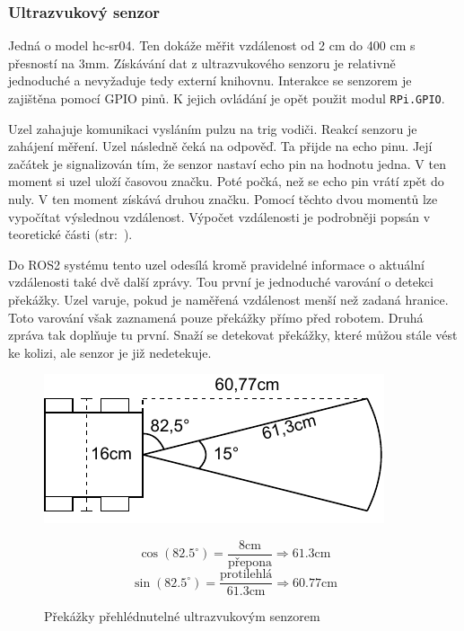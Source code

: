 \subsubsection*{Ultrazvukový senzor} \label{implementation:ultrasonic}
Jedná o model hc-sr04. Ten dokáže měřit vzdálenost od 2 cm do 400 cm s přesností na 3mm. Získávání dat z ultrazvukového senzoru je relativně jednoduché a nevyžaduje tedy externí knihovnu. Interakce se senzorem je zajištěna pomocí GPIO pinů. K jejich ovládání je opět použit modul \verb|RPi.GPIO|. 

Uzel zahajuje komunikaci vysláním pulzu na trig vodiči. Reakcí senzoru je zahájení měření. Uzel následně čeká na odpověď. Ta přijde na echo pinu. Její začátek je signalizován tím, že senzor nastaví echo pin na hodnotu jedna. V ten moment si uzel uloží časovou značku. Poté počká, než se echo pin vrátí zpět do nuly. V ten moment získává druhou značku. Pomocí těchto dvou momentů lze vypočítat výslednou vzdálenost. Výpočet vzdálenosti je podrobněji popsán v teoretické části (str:~\pageref{theory:ultrasonic}).

Do ROS2 systému tento uzel odesílá kromě pravidelné informace o aktuální vzdálenosti také dvě další zprávy. Tou první je jednoduché varování o detekci překážky. Uzel varuje, pokud je naměřená vzdálenost menší než zadaná hranice. Toto varování však zaznamená pouze překážky přímo před robotem. Druhá zpráva tak doplňuje tu první. Snaží se detekovat překážky, které můžou stále vést ke kolizi, ale senzor je již nedetekuje. 

\begin{figure}[h!]
	\centering
	\begin{minipage}[c]{0.5\textwidth}
		\centering
		\includegraphics[scale=1.0]{obrazky-figures/ultrasonic_blind_spot.pdf}
	\end{minipage}%
	\begin{minipage}[c]{0.5\textwidth}
			$$\cos(82.5^\circ) = \frac{8\text{cm}}{\text{přepona}} \Rightarrow 61.3\text{cm}$$
			$$\sin(82.5^\circ) = \frac{\text{protilehlá}}{61.3\text{cm}} \Rightarrow 60.77\text{cm}$$
	\end{minipage}
	\caption{Překážky přehlédnutelné ultrazvukovým senzorem}
	\label{fig:ultrasonic_blind_spot}
\end{figure}

